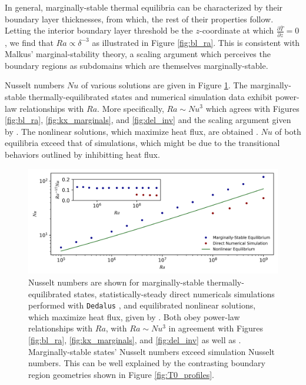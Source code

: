 \documentclass[reprint,amsmath,amssymb,aps]{revtex4-1}
\begin{document}
\par In general, marginally-stable thermal equilibria can be characterized by their boundary layer thicknesses, from which, the rest of their properties follow. Letting the interior boundary layer threshold be the $z$-coordinate at which $\frac{\partial \bar{T}}{\partial z} = 0$, we find that $Ra \propto  \delta^{-3}$ as illustrated in Figure \ref{fig:bl_ra}. This is consistent with Malkus' marginal-stability theory, a scaling argument which perceives the boundary regions as subdomains which are themselves marginally-stable.

Nusselt numbers $Nu$ of various solutions are given in Figure \ref{fig:nu_vs_ra}. The marginally-stable thermally-equilibrated states and numerical simulation data exhibit power-law relationships with $Ra$. More specifically, $Ra \sim Nu^3$ which agrees with Figures \ref{fig:bl_ra}, \ref{fig:kx_marginals}, and \ref{fig:del_inv} and the scaling argument given by \cite{Malkus}. The nonlinear solutions, which maximize heat flux, are obtained \cite{Waleffe}. $Nu$ of both equilibria exceed that of simulations, which might be due to the transitional behaviors outlined by \cite{Yalniz} inhibitting heat flux.
\begin{figure}
    \centering%
    \includegraphics[width=7.1in]{nu_ra.PNG}
    \caption{Nusselt numbers are shown for marginally-stable thermally-equilibrated states, statistically-steady direct numericals simulations performed with \texttt{Dedalus} \cite{Anders_cd}, and equilibrated nonlinear solutions, which maximize heat flux, given by \cite{Waleffe}. Both obey power-law relationships with $Ra$, with $Ra \sim Nu^3$ in agreement with Figures \ref{fig:bl_ra}, \ref{fig:kx_marginals}, and \ref{fig:del_inv} as well as \cite{Malkus}. Marginally-stable states' Nusselt numbers exceed simulation Nusselt numbers. This can be well explained by the contrasting boundary region geometries shown in Figure \ref{fig:T0_profiles}.}%
    \label{fig:nu_vs_ra}%
\end{figure}
\end{document}
